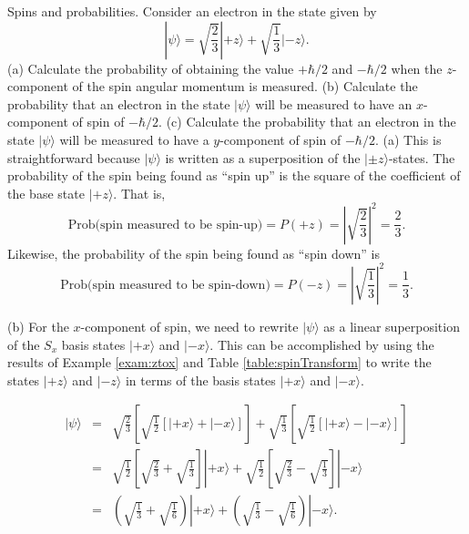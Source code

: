 \begin{example}{Spins and probabilities.} 
\label{exam:spinsProbabilities}
Consider an electron in the state given by
\begin{equation}
|\psi\rangle = \sqrt{\frac{2}{3}}|\mbox{$+z$}\rangle +
 \sqrt{\frac{1}{3}}|\mbox{$-z$}\rangle .
\label{eq:ex3}
\end{equation}
(a) Calculate the probability of obtaining the value $+\hbar/2$ and $-\hbar/2$ when
the $z$-component of the spin angular momentum is measured.  (b) Calculate the probability that an electron in the state $|\psi\rangle$
will be measured to have an $x$-component of spin of $-\hbar/2$.  (c)
Calculate the probability that an electron in the state $|\psi\rangle$
will be measured to have a $y$-component of spin of $-\hbar/2$.
\solution
(a) This is straightforward because $|\psi\rangle$ is written
as a superposition of the $|\mbox{$\pm z$}\rangle$-states. The probability of
the spin being found as ``spin up'' is the square of the
coefficient of the base state $|\mbox{$+z$}\rangle$. That is,
\begin{equation}
\mbox{Prob}\bigl(\mbox{spin measured to be spin-up}\bigr) = P(+z) = 
\left|\sqrt{\frac{2}{3}}\right|^2 = \frac{2}{3}. \nonumber
\end{equation}
\noindent Likewise, the probability of the spin being found as ``spin down'' is 
\begin{equation}
\mbox{Prob}\bigl(\mbox{spin measured to be spin-down}\bigr) = P(-z) = 
\left|\sqrt{\frac{1}{3}}\right|^2 = \frac{1}{3}.\nonumber
\end{equation}

(b) For the $x$-component of spin, we need to rewrite
$|\mbox{$\psi$}\rangle$ as a linear superposition of the $S_x$ basis
states $|\mbox{$+x$}\rangle$ and $|\mbox{$-x$}\rangle$. This can be
accomplished by using the results of Example \ref{exam:ztox} and Table
\ref{table:spinTransform} to write the states $|\mbox{$+z$}\rangle$ and
$|\mbox{$-z$}\rangle$ in terms of the basis states $|\mbox{$+x$}\rangle$
and $|\mbox{$-x$}\rangle$.

\begin{eqnarray}
|\mbox{$\psi$}\rangle & = & \sqrt{\frac{2}{3}} \left[ \sqrt{\frac{1}{2}} \left[ |\mbox{$+x$}\rangle + |\mbox{$-x$}\rangle \right] \right] + \sqrt{\frac{1}{3}} \left[ \sqrt{\frac{1}{2}} \left[ |\mbox{$+x$}\rangle - |\mbox{$-x$}\rangle \right] \right] \nonumber\\
 & = & \sqrt{\frac{1}{2}} \left[ \sqrt{\frac{2}{3}} + \sqrt{\frac{1}{3}} \right] |\mbox{$+x$}\rangle + \sqrt{\frac{1}{2}} \left[ \sqrt{\frac{2}{3}} - \sqrt{\frac{1}{3}} \right] |\mbox{$-x$}\rangle \nonumber\\
 & = & \left( \sqrt{\frac{1}{3}} + \sqrt{\frac{1}{6}}\right)|\mbox{$+x$}\rangle +  \left( \sqrt{\frac{1}{3}} - \sqrt{\frac{1}{6}}\right)|\mbox{$-x$}\rangle .
\end{eqnarray}


\end{example}
